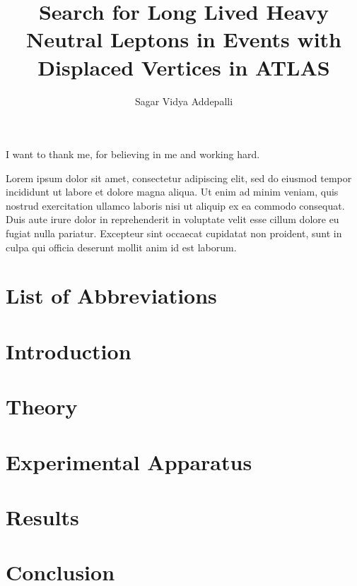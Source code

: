 \documentclass{brandeis-dissertation3.14}
\title{Search for Long Lived Heavy Neutral Leptons in Events with Displaced Vertices in ATLAS }
\author{Sagar Vidya Addepalli}
\begin{document}
\maketitlepage
\makeapproval
\frontmatter

\begin{dissertation-acknowledgements}
I want to thank me, for believing in me and working hard.
\end{dissertation-acknowledgements}

\begin{dissertation-abstract}
Lorem ipsum dolor sit amet, consectetur adipiscing elit, sed do eiusmod tempor incididunt ut labore et dolore magna aliqua. Ut enim ad minim veniam, quis nostrud exercitation ullamco laboris nisi ut aliquip ex ea commodo consequat. Duis aute irure dolor in reprehenderit in voluptate velit esse cillum dolore eu fugiat nulla pariatur. Excepteur sint occaecat cupidatat non proident, sunt in culpa qui officia deserunt mollit anim id est laborum.
\end{dissertation-abstract}

\doublespacing

\tableofcontents{}

\clearpage

\listoftables
\pagebreak
{}
\listoffigures
\pagebreak
\setcounter{secnumdepth}{0}
\chapter*{List of Abbreviations}

\setcounter{secnumdepth}{2}

\startbody

\chapter{Introduction}
\label{chap:intro}


\chapter{Theory}
\label{chap:theory}


\chapter{Experimental Apparatus}
\label{chap:experiment}


\chapter{Results}
\label{chap:results}


\chapter{Conclusion}
\label{chap:conclusion}


\printbibliography
\end{document}
